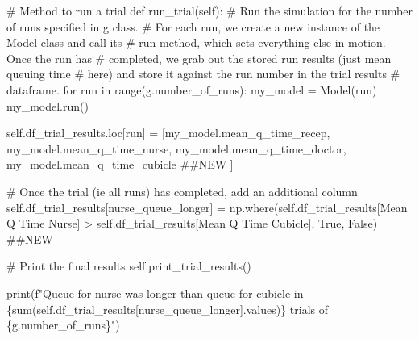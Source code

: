 \documentclass[
  letterpaper,
  DIV=11,
  numbers=noendperiod]{scrreprt}
\newenvironment{Shaded}{\begin{snugshade}}{\end{snugshade}}
\newcommand{\BuiltInTok}[1]{\textcolor[rgb]{0.00,0.23,0.31}{#1}}
\newcommand{\CommentTok}[1]{\textcolor[rgb]{0.37,0.37,0.37}{#1}}
\newcommand{\ControlFlowTok}[1]{\textcolor[rgb]{0.00,0.23,0.31}{#1}}
\newcommand{\KeywordTok}[1]{\textcolor[rgb]{0.00,0.23,0.31}{#1}}
\newcommand{\NormalTok}[1]{\textcolor[rgb]{0.00,0.23,0.31}{#1}}
\newcommand{\OperatorTok}[1]{\textcolor[rgb]{0.37,0.37,0.37}{#1}}
\newcommand{\SpecialCharTok}[1]{\textcolor[rgb]{0.37,0.37,0.37}{#1}}
\newcommand{\SpecialStringTok}[1]{\textcolor[rgb]{0.13,0.47,0.30}{#1}}
\newcommand{\StringTok}[1]{\textcolor[rgb]{0.13,0.47,0.30}{#1}}
\newcommand{\VariableTok}[1]{\textcolor[rgb]{0.07,0.07,0.07}{#1}}
\begin{document}
\begin{tcolorbox}
\begin{Shaded}
\begin{Highlighting}[]
    \CommentTok{\# Method to run a trial}
    \KeywordTok{def}\NormalTok{ run\_trial(}\VariableTok{self}\NormalTok{):}
        \CommentTok{\# Run the simulation for the number of runs specified in g class.}
        \CommentTok{\# For each run, we create a new instance of the Model class and call its}
        \CommentTok{\# run method, which sets everything else in motion.  Once the run has}
        \CommentTok{\# completed, we grab out the stored run results (just mean queuing time}
        \CommentTok{\# here) and store it against the run number in the trial results}
        \CommentTok{\# dataframe.}
        \ControlFlowTok{for}\NormalTok{ run }\KeywordTok{in} \BuiltInTok{range}\NormalTok{(g.number\_of\_runs):}
\NormalTok{            my\_model }\OperatorTok{=}\NormalTok{ Model(run)}
\NormalTok{            my\_model.run()}

            \VariableTok{self}\NormalTok{.df\_trial\_results.loc[run] }\OperatorTok{=}\NormalTok{ [my\_model.mean\_q\_time\_recep,}
\NormalTok{                                              my\_model.mean\_q\_time\_nurse,}
\NormalTok{                                              my\_model.mean\_q\_time\_doctor,}
\NormalTok{                                              my\_model.mean\_q\_time\_cubicle }\CommentTok{\#\#NEW}
\NormalTok{                                              ]}

        \CommentTok{\# Once the trial (ie all runs) has completed, add an additional column}
        \VariableTok{self}\NormalTok{.df\_trial\_results[}\StringTok{\textquotesingle{}nurse\_queue\_longer\textquotesingle{}}\NormalTok{] }\OperatorTok{=}\NormalTok{ np.where(}\VariableTok{self}\NormalTok{.df\_trial\_results[}\StringTok{\textquotesingle{}Mean Q Time Nurse\textquotesingle{}}\NormalTok{] }\OperatorTok{\textgreater{}} \VariableTok{self}\NormalTok{.df\_trial\_results[}\StringTok{\textquotesingle{}Mean Q Time Cubicle\textquotesingle{}}\NormalTok{], }\VariableTok{True}\NormalTok{, }\VariableTok{False}\NormalTok{) }\CommentTok{\#\#NEW}

        \CommentTok{\# Print the final results}
        \VariableTok{self}\NormalTok{.print\_trial\_results()}

        \BuiltInTok{print}\NormalTok{(}\SpecialStringTok{f"Queue for nurse was longer than queue for cubicle in }\SpecialCharTok{\{}\BuiltInTok{sum}\NormalTok{(}\VariableTok{self}\NormalTok{.df\_trial\_results[}\StringTok{\textquotesingle{}nurse\_queue\_longer\textquotesingle{}}\NormalTok{].values)}\SpecialCharTok{\}}\SpecialStringTok{ trials of }\SpecialCharTok{\{}\NormalTok{g}\SpecialCharTok{.}\NormalTok{number\_of\_runs}\SpecialCharTok{\}}\SpecialStringTok{"}\NormalTok{)}
\end{Highlighting}
\end{Shaded}

\end{tcolorbox}
\end{document}
